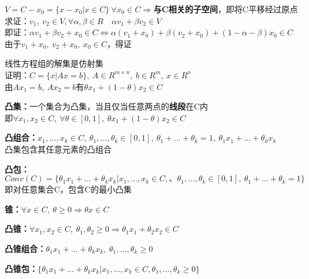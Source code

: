 \documentclass[11pt]{ctexart}         %
\begin{document}
$V=C-x_0=\{x-x_0|x\in C\}\ \forall x_0\in C\Rightarrow$\textbf{与C相关的子空间}，即将C平移经过原点\\
求证：$v_1,\ v_2\in V,\forall \alpha,\beta\in R\quad \alpha v_1+\beta v_2\in V$\\
即证：$\alpha v_1+\beta v_2+x_0\in C\Longleftrightarrow \alpha (v_1+x_0)+\beta (v_2+x_0)+(1-\alpha-\beta)x_0\in C$\\ 
\phantom{即证：}由于$v_1+x_0,\ v_2+x_0,\ x_0\in C$，得证

线性方程组的解集是仿射集\\
证明：$C=\{x|Ax=b\},\ A\in R^{m\times n},\ b\in R^m,\ x\in R^n$\\
\phantom{证明：}由$Ax_1=b,\ Ax_2=b$有$\theta x_1+(1-\theta)x_2\in C$

\hrulefill

\textbf{凸集：}一个集合为凸集，当且仅当任意两点的{\color{red}\textbf{线段}}在C内\\
\phantom{凸集：}即$\forall x_1,x_2\in C,\ \forall \theta\in [0,1],\ \theta x_1+(1-\theta)x_2\in C$

\textbf{凸组合：}$x_1,\dots,x_k\in C,\ \theta_1,\dots,\theta_k\in [0,1],\ \theta_1+\dots+\theta_k=1,\ \theta_1x_1+\dots+\theta_kx_k$\\
\phantom{凸组合：}凸集包含其任意元素的凸组合

\textbf{凸包：} $Conv(C)=\{\theta_1x_1+\dots+\theta_kx_k|x_1,\dots,x_k\in C,、 \theta_1,\dots,\theta_k\in [0,1],\ \theta_1+\dots+\theta_k=1\}$\\
\phantom{凸包：}即对任意集合C，包含C的最小凸集

\textbf{锥：}$\forall x\in C,\ \theta\geq 0\Rightarrow \theta x\in C$

\textbf{凸锥：}$\forall x_1,x_2\in C,\ \theta_1,\theta_2\geq 0\Rightarrow \theta_1x_1+\theta_2x_2\in C$

\textbf{凸锥组合：}$\theta_1x_1+\dots+\theta_kx_k,\ \theta_1,\dots,\theta_k\geq 0$

\textbf{凸锥包：}$\{\theta_1x_1+\dots+\theta_kx_k|x_1,\dots,x_k\in C, \theta_1,\dots,\theta_k\geq 0\}$

\vspace{16pt}

\end{document}
